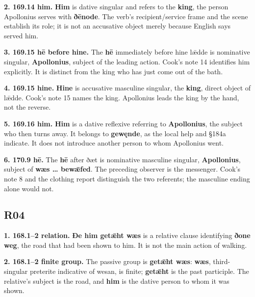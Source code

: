 \textbf{2. 169.14 him.} \textbf{Him} is dative singular and refers to the \textbf{king}, the person Apollonius serves with \textbf{ðēnode}. The verb’s recipient/\allowbreak{}service frame and the scene establish its role; it is not an accusative object merely because English says served him.

\textbf{3. 169.15 hē before hine.} The \textbf{hē} immediately before hine lǣdde is nominative singular, \textbf{Apollonius}, subject of the leading action. Cook’s note 14 identifies him explicitly. It is distinct from the king who has just come out of the bath.

\textbf{4. 169.15 hine.} \textbf{Hine} is accusative masculine singular, the \textbf{king}, direct object of lǣdde. Cook’s note 15 names the king. Apollonius leads the king by the hand, not the reverse.

\textbf{5. 169.16 him.} \textbf{Him} is a dative reflexive referring to \textbf{Apollonius}, the subject who then turns away. It belongs to \textbf{gewęnde}, as the local help and §184a indicate. It does not introduce another person to whom Apollonius went.

\textbf{6. 170.9 hē.} The \textbf{hē} after ðæt is nominative masculine singular, \textbf{Apollonius}, subject of \textbf{wæs … bewǣfed}. The preceding observer is the messenger. Cook’s note 8 and the clothing report distinguish the two referents; the masculine ending alone would not.

\subsection*{R04}

\textbf{1. 168.1–2 relation.} \textbf{Ðe him getǣht wæs} is a relative clause identifying \textbf{ðone weg}, the road that had been shown to him. It is not the main action of walking.

\textbf{2. 168.1–2 finite group.} The passive group is \textbf{getǣht wæs}: \textbf{wæs}, third-singular preterite indicative of wesan, is finite; \textbf{getǣht} is the past participle. The relative’s subject is the road, and \textbf{him} is the dative person to whom it was shown.

